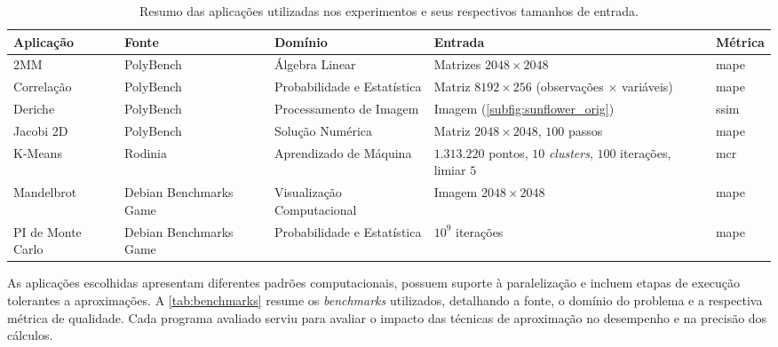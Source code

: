 \begin{table}[H]
    \centering
    \caption{Resumo das aplicações utilizadas nos experimentos e seus respectivos tamanhos de entrada.}
    \begin{tabular}{|l|p{2.2cm}|p{3.8cm}|p{3.6cm}|l|}
        \hline
        \textbf{Aplicação} & \textbf{Fonte}                                     & \textbf{Domínio}            & \textbf{Entrada}                                                   & \textbf{Métrica} \\
        \hline
        2MM                & PolyBench                         & Álgebra Linear              & Matrizes $2048 \times 2048$                                                   & \gls{mape}       \\
        \hline
        Correlação         & PolyBench                         & Probabilidade e Estatística & Matriz $8192 \times 256$ \newline (observações $\times$ variáveis)            & \gls{mape}       \\
        \hline
        Deriche            & PolyBench                         & Processamento de Imagem     & Imagem (\autoref{subfig:sunflower_orig})                                      & \gls{ssim}       \\
        \hline
        Jacobi 2D          & PolyBench                         & Solução Numérica            & Matriz $2048 \times 2048$, $100$ passos                                        & \gls{mape}       \\
        \hline
        K-Means            & Rodinia                             & Aprendizado de Máquina      & $1.313.220$ pontos, $10$ \textit{clusters}, $100$ iterações, limiar $5$  & \gls{mcr}        \\
        \hline
        Mandelbrot         & Debian Benchmarks Game & Visualização Computacional  & Imagem $2048 \times 2048$                                                     & \gls{mape}       \\
        \hline
        PI de Monte Carlo  & Debian Benchmarks Game & Probabilidade e Estatística & $10^9$ iterações                                                              & \gls{mape}       \\
        \hline
    \end{tabular}
    \fonte{}
    \label{tab:benchmarks}
\end{table}

As aplicações escolhidas apresentam diferentes padrões computacionais, possuem suporte à paralelização e incluem etapas de execução tolerantes a aproximações. A \autoref{tab:benchmarks} resume os \textit{benchmarks} utilizados, detalhando a fonte, o domínio do problema e a respectiva métrica de qualidade. Cada programa avaliado serviu para avaliar o impacto das técnicas de aproximação no desempenho e na precisão dos cálculos. 

